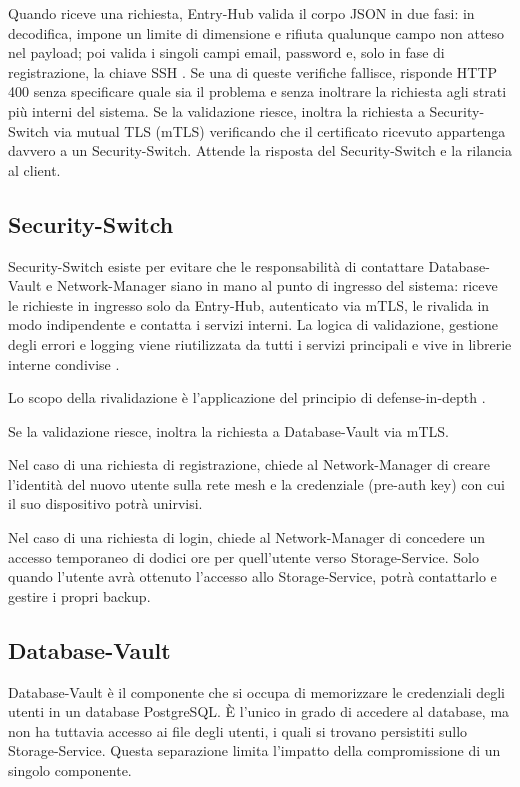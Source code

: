 Quando riceve una richiesta, Entry-Hub valida il corpo JSON in due fasi: in decodifica, impone un
limite di dimensione e rifiuta qualunque campo non atteso nel payload; poi valida i singoli
campi email, password e, solo in fase di registrazione, la chiave SSH \cite{ramusb-code-eh-f-04}. Se una di
queste verifiche fallisce, risponde HTTP 400 senza specificare quale sia il problema e senza inoltrare la
richiesta agli strati più interni del sistema. Se la validazione riesce, inoltra la richiesta a
Security-Switch via mutual TLS (mTLS) verificando che il certificato ricevuto appartenga davvero a un Security-Switch.
Attende la risposta del Security-Switch e la rilancia al client.

\subsection{Security-Switch}

Security-Switch esiste per evitare che le responsabilità di contattare Database-Vault e Network-Manager
siano in mano al punto di ingresso del sistema: riceve le richieste in ingresso solo da Entry-Hub, 
autenticato via mTLS, le rivalida in modo indipendente e contatta i servizi interni. 
La logica di validazione, gestione degli errori e logging viene riutilizzata da tutti i servizi principali 
e vive in librerie interne condivise \cite{ramusb-pkg}.

Lo scopo della rivalidazione è l'applicazione del principio di defense-in-depth \cite{nist-sp-800-53r5}.

Se la validazione riesce, inoltra la richiesta a Database-Vault via mTLS. 

Nel caso di una richiesta di registrazione, chiede al Network-Manager di creare l'identità del nuovo utente 
sulla rete mesh e la credenziale (pre-auth key) con cui il suo dispositivo potrà unirvisi. 

Nel caso di una richiesta di login, chiede al Network-Manager di concedere un accesso temporaneo di dodici ore 
per quell'utente verso Storage-Service. Solo quando l'utente avrà ottenuto l'accesso allo Storage-Service, 
potrà contattarlo e gestire i propri backup.

\subsection{Database-Vault}
Database-Vault è il componente che si occupa di memorizzare le credenziali degli utenti in un database 
PostgreSQL. È l'unico in grado di accedere al database, ma non ha tuttavia accesso ai file degli utenti, 
i quali si trovano persistiti sullo Storage-Service. Questa separazione limita l'impatto della 
compromissione di un singolo componente.

